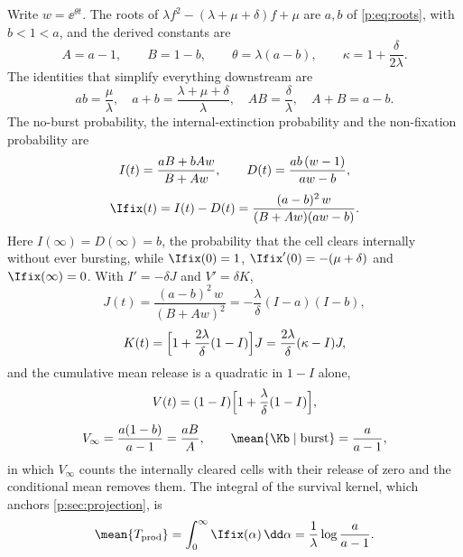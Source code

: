 Write $w=\ee^{\theta t}$. The roots of $\lambda f^2-(\lambda+\mu+\delta)f+\mu$
are $a,b$ of \cref{p:eq:roots}, with $b<1<a$, and the derived constants are
\begin{equation}
A=a-1,\qquad B=1-b,\qquad \theta=\lambda(a-b),\qquad
\kappa=1+\frac{\delta}{2\lambda}.
\label{p:eq:derived}
\end{equation}
The identities that simplify everything downstream are
\begin{equation}
ab=\frac{\mu}{\lambda},\quad a+b=\frac{\lambda+\mu+\delta}{\lambda},\quad
AB=\frac{\delta}{\lambda},\quad A+B=a-b.
\label{p:eq:AB}
\end{equation}
The no-burst probability, the internal-extinction probability and the
non-fixation probability are
\begin{equation}
\begin{gathered}
I(t)=\frac{aB+bAw}{B+Aw},\qquad
D(t)=\frac{ab\,(w-1)}{aw-b},\\[0.35em]
\Ifix(t)=I(t)-D(t)=\frac{(a-b)^2\,w}{(B+Aw)(aw-b)}.
\end{gathered}
\label{p:eq:IDIhat}
\end{equation}
Here $I(\infty)=D(\infty)=b$, the probability that the cell clears
internally without ever bursting, while $\Ifix(0)=1$,
$\Ifix'(0)=-(\mu+\delta)$ and $\Ifix(\infty)=0$. With $I'=-\delta J$ and
$V'=\delta K$,
\begin{equation}
J(t)=\frac{(a-b)^2\,w}{(B+Aw)^2}=-\frac{\lambda}{\delta}(I-a)(I-b),
\label{p:eq:J}
\end{equation}
\begin{equation}
K(t)=\Bigl[1+\frac{2\lambda}{\delta}(1-I)\Bigr]J
=\frac{2\lambda}{\delta}(\kappa-I)J,
\label{p:eq:K}
\end{equation}
and the cumulative mean release is a quadratic in $1-I$ alone,
\begin{equation}
\begin{gathered}
V(t)=(1-I)\Bigl[1+\frac{\lambda}{\delta}(1-I)\Bigr],\\[0.35em]
V_\infty=\frac{a(1-b)}{a-1}=\frac{aB}{A},
\qquad
\mean{\Kb\mid\text{burst}}=\frac{a}{a-1},
\end{gathered}
\label{p:eq:V}
\end{equation}
in which $V_\infty$ counts the internally cleared cells with their release
of zero and the conditional mean removes them. The integral of the survival
kernel, which anchors \cref{p:sec:projection}, is
\begin{equation}
\mean{T_{\rm prod}}=\int_0^\infty\Ifix(\alpha)\,\dd\alpha
=\frac{1}{\lambda}\log\frac{a}{a-1}.
\label{p:eq:lifetime}
\end{equation}

